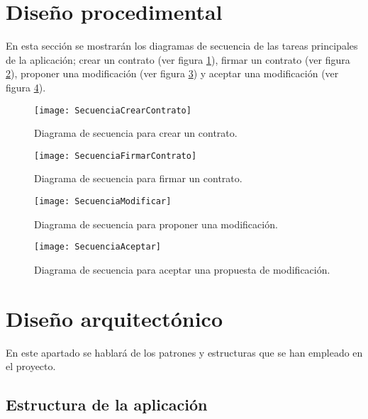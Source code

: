 \section{Diseño procedimental}

En esta sección se mostrarán los diagramas de secuencia de las tareas principales de la aplicación; crear un contrato (ver figura \ref{fig:SecuenciaCrearContrato}), firmar un contrato (ver figura \ref{fig:SecuenciaFirmarContrato}), proponer una modificación (ver figura \ref{fig:SecuenciaModificar}) y aceptar una modificación (ver figura \ref{fig:SecuenciaAceptar}).

\begin{figure}[h]
	\centering
	\texttt{[image: SecuenciaCrearContrato]}
	\caption[Diagrama secuencia creación contrato]{Diagrama de secuencia para crear un contrato.}
	\label{fig:SecuenciaCrearContrato}
\end{figure}

\begin{figure}[h]
	\centering
	\texttt{[image: SecuenciaFirmarContrato]}
	\caption[Diagrama secuencia firmar contrato]{Diagrama de secuencia para firmar un contrato.}
	\label{fig:SecuenciaFirmarContrato}
\end{figure}

\begin{figure}[h]
	\centering
	\texttt{[image: SecuenciaModificar]}
	\caption[Diagrama secuencia proponer modificación]{Diagrama de secuencia para proponer una modificación.}
	\label{fig:SecuenciaModificar}
\end{figure}

\begin{figure}[h]
	\centering
	\texttt{[image: SecuenciaAceptar]}
	\caption[Diagrama secuencia aceptar cambios]{Diagrama de secuencia para aceptar una propuesta de modificación.}
	\label{fig:SecuenciaAceptar}
\end{figure}

\section{Diseño arquitectónico}

En este apartado se hablará de los patrones y estructuras que se han empleado en el proyecto.

\subsection{Estructura de la aplicación}


